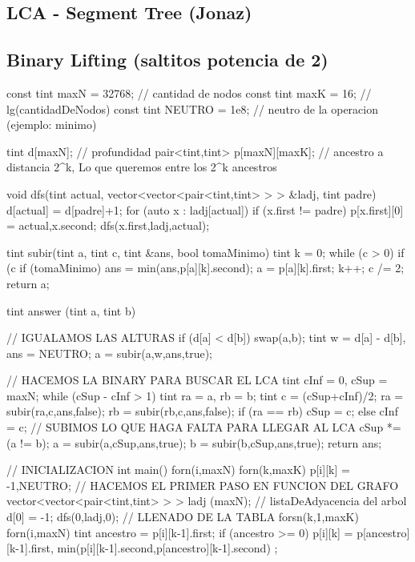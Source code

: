 \subsection{LCA - Segment Tree (Jonaz)}
\begin{code}
\end{code}

\subsection{Binary Lifting (saltitos potencia de 2)}
\begin{code}
const tint maxN = 32768; // cantidad de nodos
const tint maxK = 16;	 // lg(cantidadDeNodos)
const tint NEUTRO = 1e8; // neutro de la operacion (ejemplo: minimo)

tint d[maxN]; // profundidad
pair<tint,tint> p[maxN][maxK]; 
// {ancestro a distancia 2^k, Lo que queremos entre los 2^k ancestros}

void dfs(tint actual, vector<vector<pair<tint,tint> > > &ladj, tint padre)
{
	d[actual] = d[padre]+1;
	for (auto x : ladj[actual])
		if (x.first != padre)
		{
			p[x.first][0] = {actual,x.second};
			dfs(x.first,ladj,actual);
		}
}

tint subir(tint a, tint c, tint &ans, bool tomaMinimo)
{
	tint k = 0;
	while (c > 0)
	{
		if (c %
		{
			if (tomaMinimo)
				ans = min(ans,p[a][k].second);
			a = p[a][k].first;
		}
		k++;
		c /= 2;
	}
	return a;
}

tint answer (tint a, tint b)
{
	// IGUALAMOS LAS ALTURAS
	if (d[a] < d[b])
		swap(a,b);
	tint w = d[a] - d[b], ans = NEUTRO;
	a = subir(a,w,ans,true);
	
	// HACEMOS LA BINARY PARA BUSCAR EL LCA
	tint cInf = 0, cSup = maxN; 
	while (cSup - cInf > 1)
	{
		tint ra = a, rb = b;
		tint c = (cSup+cInf)/2;
		ra = subir(ra,c,ans,false);
		rb = subir(rb,c,ans,false);
		if (ra == rb)
			cSup = c;
		else
			cInf = c;
	}
	// SUBIMOS LO QUE HAGA FALTA PARA LLEGAR AL LCA
	cSup *= (a != b);
	a = subir(a,cSup,ans,true);
	b = subir(b,cSup,ans,true);
	return ans;
}

// INICIALIZACION
int main()
{
	forn(i,maxN)
	forn(k,maxK)
		p[i][k] = {-1,NEUTRO};
	// HACEMOS EL PRIMER PASO EN FUNCION DEL GRAFO
	vector<vector<pair<tint,tint> > > ladj (maxN); // listaDeAdyacencia del arbol
	d[0] = -1;
	dfs(0,ladj,0);
	// LLENADO DE LA TABLA
	forsn(k,1,maxK)	
	forn(i,maxN)
	{
		tint ancestro = p[i][k-1].first;
		if (ancestro >= 0)
			p[i][k] = {p[ancestro][k-1].first, 
					       min(p[i][k-1].second,p[ancestro][k-1].second) };
	}
}
\end{code}
